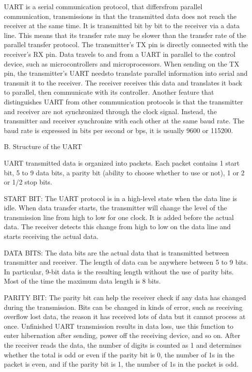 \documentclass[12pt,a4paper]{article}
\numberwithin{equation}{section}
\begin{document}
UART is a serial communication protocol, that differsfrom parallel
communication, transmissions in that the transmitted data does not reach
the receiver at the same time. It is transmitted bit by bit to the
receiver via a data line. This means that its transfer rate may be
slower than the transfer rate of the parallel transfer protocol. The
transmitter's TX pin is directly connected with the receiver's RX pin.
Data travels to and from a UART in parallel to the control device, such
as microcontrollers and microprocessors. When sending on the TX pin, the
transmitter's UART needsto translate parallel information into serial
and transmit it to the receiver. The receiver receives this data and
translates it back to parallel, then communicate with its controller.
Another feature that distinguishes UART from other communication
protocols is that the transmitter and receiver are not synchronized
through the clock signal. Instead, the transmitter and receiver
synchronize with each other at the same baud rate. The baud rate is
expressed in bits per second or bps, it is usually 9600 or 115200.

B.  Structure of the UART

    UART transmitted data is organized into packets. Each packet
    contains 1 start bit, 5 to 9 data bits, a parity bit (ability to
    choose whether to use or not), 1 or 2 or 1/2 stop bits.

    START BIT: The UART protocol is in a high-level state when the data
    line is idle. When data transfer starts, the transmitter will change
    the level of the transmission line from high to low for one clock.
    It is added before the actual data. The receiver detects this change
    from high to low on the data line and starts receiving the actual
    data.

    DATA BITS: The data bits are the actual data that is transmitted
    between transmitter and receiver. The length of data can be anywhere
    between 5 to 9 bits. In particular, 9-bit data is the resulting
    length without the use of parity bits. Most of the time the maximum
    data length is 8 bits.

    PARITY BIT: The parity bit can help the receiver check if any data
    has changed during the transmission. Bits can be changed in kinds of
    error, such as receiving overflow lost data, the reason it has
    received lots of data but it cannot process at once. Unfinished UART
    transmission results in data loss, use this function to enter
    hibernation after sending, power off the receiving device, and so
    on. After the receiver reads the data, the number of digits is
    counted as 1 and determines whether the total is odd or even if the
    parity bit is 0, the number of 1s in the packet is even, and if the
    parity bit is 1, the number of 1s in the packet is odd.
\end{document}
